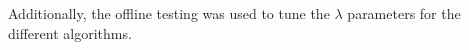 Additionally, the offline testing was used to tune the $\lambda$ parameters for the different algorithms.

\begin{figure}[h]
\centering
{}

\end{figure}

